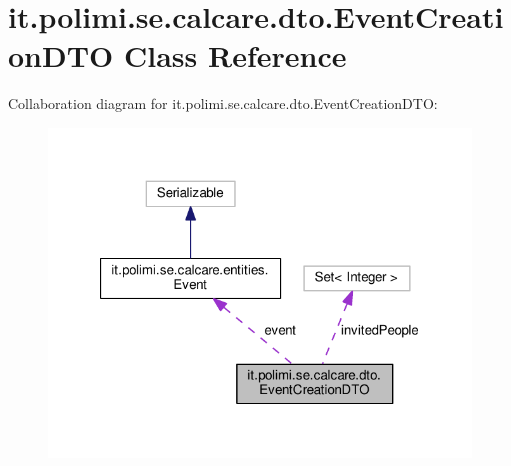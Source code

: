 \hypertarget{classit_1_1polimi_1_1se_1_1calcare_1_1dto_1_1EventCreationDTO}{}\section{it.\+polimi.\+se.\+calcare.\+dto.\+Event\+Creation\+D\+T\+O Class Reference}
\label{classit_1_1polimi_1_1se_1_1calcare_1_1dto_1_1EventCreationDTO}


Collaboration diagram for it.\+polimi.\+se.\+calcare.\+dto.\+Event\+Creation\+D\+T\+O\+:
\nopagebreak
\begin{figure}[H]
\begin{center}
\leavevmode
\includegraphics[width=321pt]{classit_1_1polimi_1_1se_1_1calcare_1_1dto_1_1EventCreationDTO__coll__graph}
\end{center}
\end{figure}
